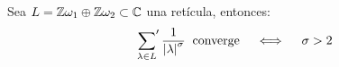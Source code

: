 \documentclass[../../tesis_maestria]{subfiles}
\begin{document}
\begin{prop}\label{lema:conv_abs_sobre_reticula} %
  Sea $L=\mathbb{Z}\omega_1\oplus\mathbb{Z}\omega_2\subset\mathbb{C}$ una ret\'icula, entonces:
  \[
    \sideset{}{'}\sum_{\lambda\in L}\frac{1}{\left| \lambda \right|^{\sigma}}\;\;\text{converge}
    \quad\iff\quad\sigma>2
  \]
\end{prop}%

\end{document}
